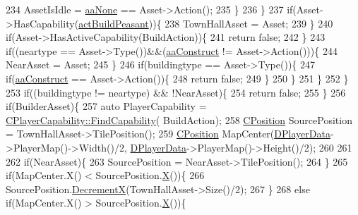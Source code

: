 \begin{DoxyCode}
234                     AssetIsIdle = \hyperlink{GameDataTypes_8h_ab47668e651a3032cfb9c40ea2d60d670ac17cc5a0035320c060d7f8074143b507}{aaNone} == Asset->Action();
235                 \}
236             \}
237             \textcolor{keywordflow}{if}(Asset->HasCapability(\hyperlink{GameDataTypes_8h_a35b98ce26aca678b03c6f9f76e4778cea66c601dce0fc095460b3c2c25f66ee71}{actBuildPeasant}))\{
238                 TownHallAsset = Asset;
239             \}
240             \textcolor{keywordflow}{if}(Asset->HasActiveCapability(BuildAction))\{
241                 \textcolor{keywordflow}{return} \textcolor{keyword}{false};    
242             \}
243             \textcolor{keywordflow}{if}((neartype == Asset->Type())&&(\hyperlink{GameDataTypes_8h_ab47668e651a3032cfb9c40ea2d60d670a7ef6b863f66dd7dcc95a199cd758ae1d}{aaConstruct} != Asset->Action()))\{
244                 NearAsset = Asset;
245             \}
246             \textcolor{keywordflow}{if}(buildingtype == Asset->Type())\{
247                 \textcolor{keywordflow}{if}(\hyperlink{GameDataTypes_8h_ab47668e651a3032cfb9c40ea2d60d670a7ef6b863f66dd7dcc95a199cd758ae1d}{aaConstruct} == Asset->Action())\{
248                     \textcolor{keywordflow}{return} \textcolor{keyword}{false};   
249                 \}
250             \}
251         \}
252     \}
253     \textcolor{keywordflow}{if}((buildingtype != neartype) && !NearAsset)\{
254         \textcolor{keywordflow}{return} \textcolor{keyword}{false};    
255     \}
256     \textcolor{keywordflow}{if}(BuilderAsset)\{
257         \textcolor{keyword}{auto} PlayerCapability = \hyperlink{classCPlayerCapability_a881ba4b87385d7cfe5cb6ced2d26f226}{CPlayerCapability::FindCapability}(
      BuildAction); 
258         \hyperlink{classCPosition}{CPosition} SourcePosition = TownHallAsset->TilePosition();
259         \hyperlink{classCPosition}{CPosition} MapCenter(\hyperlink{classCAIPlayer_a83b5113c8f7e80df54940b647c5ee2e6}{DPlayerData}->PlayerMap()->Width()/2, 
      \hyperlink{classCAIPlayer_a83b5113c8f7e80df54940b647c5ee2e6}{DPlayerData}->PlayerMap()->Height()/2);
260         
261         
262         \textcolor{keywordflow}{if}(NearAsset)\{
263             SourcePosition = NearAsset->TilePosition();
264         \}
265         \textcolor{keywordflow}{if}(MapCenter.X() < SourcePosition.\hyperlink{classCPosition_a9a6b94d3b91df1492d166d9964c865fc}{X}())\{
266             SourcePosition.\hyperlink{classCPosition_a64f0d8ef8ca26c8b66b0997b3b132416}{DecrementX}(TownHallAsset->Size()/2);   
267         \}
268         \textcolor{keywordflow}{else} \textcolor{keywordflow}{if}(MapCenter.X() > SourcePosition.\hyperlink{classCPosition_a9a6b94d3b91df1492d166d9964c865fc}{X}())\{

\end{DoxyCode}
